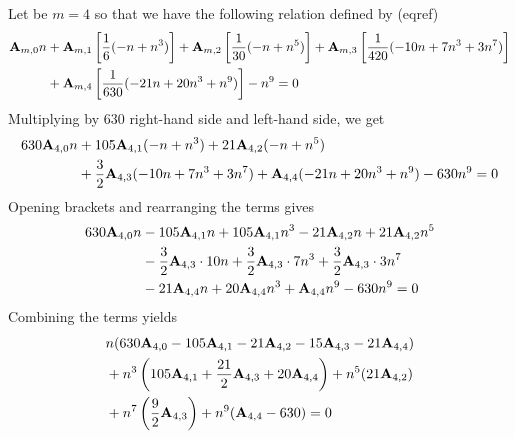 \begin{examp}
    Let be $m=4$ so that we have the following relation defined by (eqref)
    \begin{equation*}
        \begin{split}
            {\mathbf{A}} \sb{m,0} n
            &+ {\mathbf{A}} \sb{m,1} \left[ \frac{1}{6} (-n + n^3) \right]
            + {\mathbf{A}} \sb{m,2} \left[ \frac{1}{30} (-n + n^5) \right]
            + {\mathbf{A}} \sb{m,3} \left[ \frac{1}{420} (-10 n + 7 n^3 + 3 n^7) \right] \\
            &+ {\mathbf{A}} \sb{m,4} \left[ \frac{1}{630} (-21 n + 20 n^3 + n^9) \right] - n^9 = 0
        \end{split}
    \end{equation*}
    Multiplying by $630$ right-hand side and left-hand side, we get
    \begin{equation*}
        \begin{split}
            630 {\mathbf{A}} \sb{4,0} n
            &+ 105 {\mathbf{A}} \sb{4,1} (-n + n^3) + 21 {\mathbf{A}} \sb{4,2} (-n + n^5) \\
            &+ \frac{3}{2} {\mathbf{A}} \sb{4,3} (-10 n + 7 n^3 + 3 n^7) + {\mathbf{A}} \sb{4,4} (-21 n + 20 n^3 + n^9) - 630 n^9 = 0
        \end{split}
    \end{equation*}
    Opening brackets and rearranging the terms gives
    \begin{equation*}
        \begin{split}
            630 {\mathbf{A}} \sb{4,0} n
            &- 105 {\mathbf{A}} \sb{4,1} n + 105 {\mathbf{A}} \sb{4,1} n ^3 - 21 {\mathbf{A}} \sb{4,2} n + 21 {\mathbf{A}} \sb{4,2} n^5 \\
            &- \frac{3}{2} {\mathbf{A}} \sb{4,3} \cdot 10n + \frac{3}{2} {\mathbf{A}} \sb{4,3} \cdot 7n^3 + \frac{3}{2} {\mathbf{A}} \sb{4,3} \cdot 3n^7 \\
            &-21 {\mathbf{A}} \sb{4,4} n + 20 {\mathbf{A}} \sb{4,4} n^3 + {\mathbf{A}} \sb{4,4} n ^9 - 630 n^9 = 0
        \end{split}
    \end{equation*}
    Combining the terms yields
    \begin{equation*}
        \begin{split}
            &n (630 \coeffA{4}{0} - 105 \coeffA{4}{1} - 21 \coeffA{4}{2} - 15 \coeffA{4}{3} - 21 \coeffA{4}{4})  \\
            &+ n^3 \left( 105 \coeffA{4}{1} + \frac{21}{2} \coeffA{4}{3} + 20 \coeffA{4}{4} \right) + n^5 (21 \coeffA{4}{2}) \\
            &+ n^7 \left( \frac{9}{2} \coeffA{4}{3} \right) + n^9 (\coeffA{4}{4} - 630) = 0

\end{split}
\end{equation*}
\end{examp}
